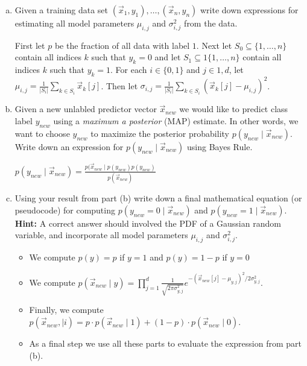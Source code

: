\documentclass[10pt]{article}
\begin{document}
\begin{enumerate}[(a)]
	\item Given a training data set $(\vec{x}_1,y_1), \ldots, (\vec{x}_n,y_n)$ write down expressions for estimating all model parameters $\mu_{i,j}$ and  $\sigma_{i,j}^2$ from the data.
	
	\color{blue}
	First let $p$ be the fraction of all data with label $1$. Next let $S_0\subseteq \{1,\ldots, n\}$ contain all indices $k$ such that $y_k = 0$ and let $S_1\subseteq 1\{1,\ldots, n\}$ contain all indices $k$ such that $y_k = 1$. 
	For each $i\in \{0,1\}$ and $j\in 1,d$, let $\mu_{i,j} = \frac{1}{|S_i|}\sum_{k \in S_i} \vec{x}_k[j]$. Then let $\sigma_{i,j} = \frac{1}{|S_i|}\sum_{k \in S_i} (\vec{x}_k[j] - \mu_{i,j})^2$.
	\color{black}
	
	\item Given a new unlabled predictor vector $\vec{x}_{new}$ we would like to predict class label ${y}_{new}$ using a \emph{maximum a posterior} (MAP) estimate. In other words, we want to choose ${y}_{new}$ to maximize the posterior probability $p({y}_{new} \mid \vec{x}_{new} )$. Write down an expression for $p({y}_{new} \mid \vec{x}_{new} )$ using Bayes Rule.
	
	\color{blue}
	$p({y}_{new} \mid \vec{x}_{new} ) = \frac{p(\vec{x}_{new}  \mid p({y}_{new} )p(y_{new})}{p(\vec{x}_{new} )}$
	\color{black}
	
	
	\item Using your result from part (b) write down a final mathematical equation (or pseudocode) for computing $p({y}_{new}=0\mid \vec{x}_{new} )$ and $p({y}_{new}=1\mid \vec{x}_{new})$. \textbf{Hint:} A correct answer should involved the PDF of a Gaussian random variable, and incorporate all model parameters $\mu_{i,j}$ and  $\sigma_{i,j}^2$.
	
	\color{blue}
	\begin{itemize}
	\item We compute $p(y) = p$ if $y = 1$ and $p(y) = 1-p$ if $y = 0$ 
	\item We compute $p(\vec{x}_{new}  \mid y) = \prod_{j=1}^d \frac{1}{\sqrt{2\pi\sigma_{y,j}^2}} e^{-(\vec{x}_{new}[j]- \mu_{y,j})^2/2\sigma_{y,j}^2} $.
	\item Finally, we compute $p(\vec{x}_{new},  \mid i) = p\cdot p(\vec{x}_{new}  \mid 1) + (1-p)\cdot p(\vec{x}_{new}  \mid 0)$.
	\item As a final step we use all these parts to evaluate the expression from part (b).
	\end{itemize}
	\color{black}
	

\end{enumerate}
\end{document}
